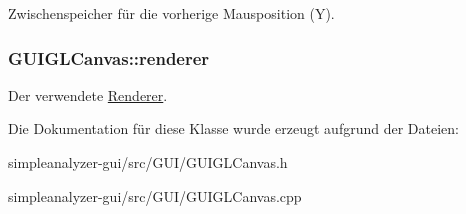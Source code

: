 Zwischenspeicher für die vorherige Mausposition (Y). \hypertarget{classGUIGLCanvas_a33a4ad3bc364d697396c55d011bfac44}{
\subsubsection[{renderer}]{ G\-U\-I\-G\-L\-Canvas\-::renderer\hspace{0.3cm}{\ttfamily [private]}}}\label{classGUIGLCanvas_a33a4ad3bc364d697396c55d011bfac44}
Der verwendete \hyperlink{classRenderer}{Renderer}. 

Die Dokumentation für diese Klasse wurde erzeugt aufgrund der Dateien\-:\begin{DoxyCompactItemize}
\item 
simpleanalyzer-\/gui/src/\-G\-U\-I/G\-U\-I\-G\-L\-Canvas.\-h\item 
simpleanalyzer-\/gui/src/\-G\-U\-I/G\-U\-I\-G\-L\-Canvas.\-cpp\end{DoxyCompactItemize}
